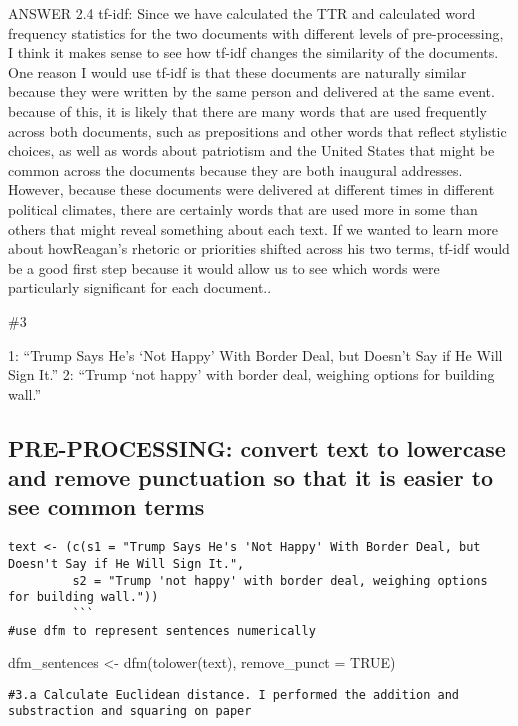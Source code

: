 \documentclass[
]{article}
\begin{document}
ANSWER 2.4 tf-idf: Since we have calculated the TTR and calculated word
frequency statistics for the two documents with different levels of
pre-processing, I think it makes sense to see how tf-idf changes the
similarity of the documents. One reason I would use tf-idf is that these
documents are naturally similar because they were written by the same
person and delivered at the same event. because of this, it is likely
that there are many words that are used frequently across both
documents, such as prepositions and other words that reflect stylistic
choices, as well as words about patriotism and the United States that
might be common across the documents because they are both inaugural
addresses. However, because these documents were delivered at different
times in different political climates, there are certainly words that
are used more in some than others that might reveal something about each
text. If we wanted to learn more about howReagan's rhetoric or
priorities shifted across his two terms, tf-idf would be a good first
step because it would allow us to see which words were particularly
significant for each document..

\#3

1: ``Trump Says He's `Not Happy' With Border Deal, but Doesn't Say if He
Will Sign It.'' 2: ``Trump `not happy' with border deal, weighing
options for building wall.''

\hypertarget{pre-processing-convert-text-to-lowercase-and-remove-punctuation-so-that-it-is-easier-to-see-common-terms}{%
\subsection{PRE-PROCESSING: convert text to lowercase and remove
punctuation so that it is easier to see common
terms}\label{pre-processing-convert-text-to-lowercase-and-remove-punctuation-so-that-it-is-easier-to-see-common-terms}}

\begin{verbatim}
text <- (c(s1 = "Trump Says He's 'Not Happy' With Border Deal, but Doesn't Say if He Will Sign It.", 
         s2 = "Trump 'not happy' with border deal, weighing options for building wall."))
         ```
#use dfm to represent sentences numerically 
\end{verbatim}

dfm\_sentences \textless- dfm(tolower(text), remove\_punct = TRUE)

\begin{verbatim}
#3.a Calculate Euclidean distance. I performed the addition and substraction and squaring on paper
\end{verbatim}
\end{document}
